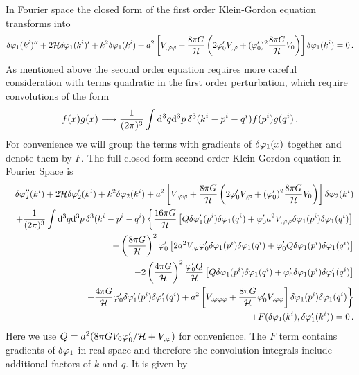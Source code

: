 In Fourier space the closed form of the first order Klein-Gordon equation
transforms into
%
\begin{equation}
\label{eq:fokg}
 \delta\varphi_{1}(k^i)'' + 2\mathcal{H} \delta\varphi_{1}(k^i)' + k^2\delta\varphi_{1}(k^i) + a^2 \left[V_{,\varphi\varphi} +
\frac{8\pi G}{\mathcal{H}}\left(2\varphi_{0}' V_{,\varphi} + (\varphi_{0}')^2\frac{8\pi G
}{\mathcal{H}}V_{0}\right)\right]\delta\varphi_{1}(k^i) = 0 \,.
\end{equation}
%
As mentioned above the second order equation requires more careful
consideration with terms quadratic in the first order perturbation, which
 require convolutions of the form
%
\begin{equation}
 f(x)g(x) \longrightarrow \frac{1}{(2 \pi)^3} \int \mathrm{d}^3q \mathrm{d}^3p\, \delta^3(k^i
-p^i -q^i) f(p^i)
g(q^i) \,.
\end{equation}
%
For convenience we will group the terms with gradients of $\delta\varphi_{1}(x)$
together and denote them by $F$. 
The full closed form second order Klein-Gordon
equation in Fourier Space is
%  
\begin{eqnarray}
\label{eq:SOKG-real-num}
 &&\dvp2''(\kvi) + 2\H \dvp2'(\kvi) + k^2 \dvp2(\kvi)
%
+ a^2\left[\Upp + \frac{8\pi G}{\H}\left(2\vp_{0}'\Uphi
+ (\vp_0')^2\frac{8\pi G}{\H}\U \right) \right]\dvp2(\kvi) \nonumber \\
% 
 && + \frac{1}{(2\pi)^3}\int \d^3q \d^3p\, \delta^3(\kvi -\pvi -\qvi) \left\{
\frac{16\pi G}{\H}
\left[ Q
\dvp1'(\pvi) \dvp1(\qvi) + \vp_{0}' a^2\Upp \dvp1(\pvi)\dvp1(\qvi)
\right] \right. \nonumber \\
%
 && + \left(\frac{8\pi G}{\H}\right)^2\vp_{0}'\left[2a^2\Uphi\vp_{0}'
\dvp1(\pvi)\dvp1(\qvi) + \vp_{0}'Q\dvp1(\pvi)\dvp1(\qvi) \right]
\nonumber \\
%
 && -2\left(\frac{4\pi G}{\H}\right)^2\frac{\vp_{0}' Q}{\H} \left[Q\dvp1(\pvi)
\dvp1(\qvi) +
\vp_{0}' \dvp1(\pvi) \dvp1'(\qvi)\right] \nonumber \\
%
 && \left. +\frac{4\pi G}{\H} \vp_{0}' \dvp1'(\pvi) \dvp1'(\qvi) 
 + a^2\left[\Uppp + \frac{8\pi G}{\H}\vp_{0}' \Upp\right] \dvp1(\pvi)
\dvp1(\qvi) \right\} \nonumber \\
 && + F(\dvp1(\kvi), \dvp1'(\kvi)) = 0\,.
\end{eqnarray}
%
Here we use $Q=a^2 (8\pi G V_{0} \varphi_0'/\mathcal{H} + V_{,\varphi})$ for convenience.
The $F$ term contains gradients of $\delta\varphi_{1}$ in real space and therefore
the convolution integrals include additional factors of $k$ and
$q$. It is given by
%
